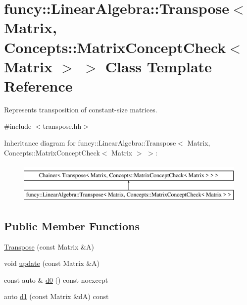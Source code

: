 \hypertarget{classfuncy_1_1LinearAlgebra_1_1Transpose_3_01Matrix_00_01Concepts_1_1MatrixConceptCheck_3_01Matrix_01_4_01_4}{\section{funcy\-:\-:Linear\-Algebra\-:\-:Transpose$<$ Matrix, Concepts\-:\-:Matrix\-Concept\-Check$<$ Matrix $>$ $>$ Class Template Reference}
\label{classfuncy_1_1LinearAlgebra_1_1Transpose_3_01Matrix_00_01Concepts_1_1MatrixConceptCheck_3_01Matrix_01_4_01_4}
}


Represents transposition of constant-\/size matrices.  




{\ttfamily \#include $<$transpose.\-hh$>$}

Inheritance diagram for funcy\-:\-:Linear\-Algebra\-:\-:Transpose$<$ Matrix, Concepts\-:\-:Matrix\-Concept\-Check$<$ Matrix $>$ $>$\-:\begin{figure}[H]
\begin{center}
\leavevmode
\includegraphics[height=2.000000cm]{classfuncy_1_1LinearAlgebra_1_1Transpose_3_01Matrix_00_01Concepts_1_1MatrixConceptCheck_3_01Matrix_01_4_01_4}
\end{center}
\end{figure}
\subsection*{Public Member Functions}
\begin{DoxyCompactItemize}
\item 
\hyperlink{classfuncy_1_1LinearAlgebra_1_1Transpose_3_01Matrix_00_01Concepts_1_1MatrixConceptCheck_3_01Matrix_01_4_01_4_a027d7ff68755976f175cf1a8dc1b8ece}{Transpose} (const Matrix \&A)
\item 
void \hyperlink{classfuncy_1_1LinearAlgebra_1_1Transpose_3_01Matrix_00_01Concepts_1_1MatrixConceptCheck_3_01Matrix_01_4_01_4_a80b7b969d9603a112c1f0495953a77e7}{update} (const Matrix \&A)
\item 
const auto \& \hyperlink{classfuncy_1_1LinearAlgebra_1_1Transpose_3_01Matrix_00_01Concepts_1_1MatrixConceptCheck_3_01Matrix_01_4_01_4_a663907b64fedcabc22c3c90e92f601ea}{d0} () const noexcept
\item 
auto \hyperlink{classfuncy_1_1LinearAlgebra_1_1Transpose_3_01Matrix_00_01Concepts_1_1MatrixConceptCheck_3_01Matrix_01_4_01_4_a06d016650a61d105d6cea97c603d8cbe}{d1} (const Matrix \&d\-A) const 
\end{DoxyCompactItemize}


